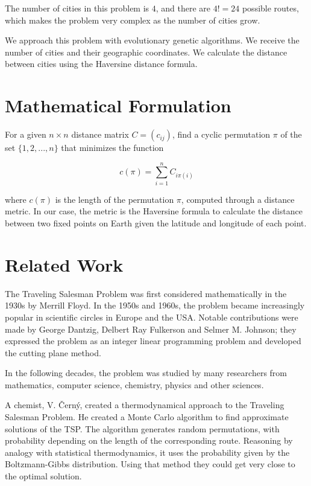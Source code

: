 \documentclass[twoside,twocolumn]{article}
\begin{document}
  The number of cities in this problem is $4$, and there are $4! = 24$ possible routes, which makes the problem very complex as the number of cities grow.\linebreak
  
  We approach this problem with evolutionary genetic algorithms. We receive the number of cities and their geographic coordinates. We calculate the distance between cities using the Haversine distance formula.\linebreak
  
  
  \section{Mathematical Formulation}
  
  For a given $n \times n$ distance matrix $C = (c_{ij})$, find a cyclic permutation $\pi$ of the set $\{1, 2, ..., n\}$ that minimizes the function
  
  \begin{equation}
  c(\pi) = \sum_{i=1}^{n} C_{i\pi(i)}
  \end{equation}
  
  where $c(\pi)$ is the length of the permutation $\pi$, computed through a distance metric. In our case, the metric is the Haversine formula to calculate the distance between two fixed points on Earth given the latitude and longitude of each point.
  
  \section{Related Work}
  
  The Traveling Salesman Problem was first considered mathematically in the 1930s by Merrill Floyd. In the 1950s and 1960s, the problem became increasingly popular in scientific circles in Europe and the USA. Notable contributions were made by George Dantzig, Delbert Ray Fulkerson and Selmer M. Johnson; they expressed the problem as an integer linear programming problem and developed the cutting plane method.\linebreak
  
  In the following decades, the problem was studied by many researchers from mathematics, computer science, chemistry, physics and other sciences.\linebreak
  
  A chemist, V. Černý, created a thermodynamical approach to the Traveling Salesman Problem. He created a Monte Carlo algorithm to find approximate solutions of the TSP. The algorithm generates random permutations, with probability depending on the length of the corresponding route. Reasoning by analogy with statistical thermodynamics, it uses the probability given by the Boltzmann-Gibbs distribution. Using that method they could get very close to the optimal solution.\linebreak
  
\end{document}
